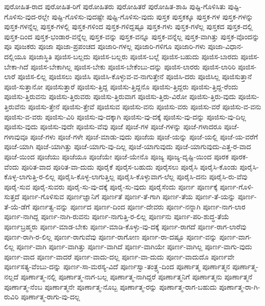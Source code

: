 {ಪುರೋಹಿತ-ರಾದ
ಪುರೋಹಿತ-ರಿಗೆ
ಪುರೋಹಿತರು
ಪುರೋಹಿತರೆ
ಪುರೋಹಿತ-ಶಾಹಿ
ಪುಷ್ಟಿ-ಗೊಳಿಸಿತು
ಪುಷ್ಟಿ-ಗೊಳಿಸು-ವುದ-ರಲ್ಲೇ
ಪುಷ್ಟಿ-ಗೊಳಿಸು-ವುದಷ್ಟೇ
ಪುಷ್ಟಿ-ಗೊಳಿಸು-ವುದು
ಪುಸ್ತಕ
ಪುಸ್ತಕಕ್ಕೂ
ಪುಸ್ತಕ-ಗಳ
ಪುಸ್ತಕ-ಗಳನ್ನು
ಪುಸ್ತಕ-ಗಳನ್ನೆಲ್ಲ
ಪುಸ್ತಕ-ಗಳಲ್ಲಿ
ಪುಸ್ತಕ-ಗಳಿಂದ
ಪುಸ್ತಕ-ಗಳಿದ್ದಷ್ಟೂ
ಪುಸ್ತಕ-ಗಳು
ಪುಸ್ತಕ-ಗಳೆಲ್ಲ
ಪುಸ್ತಕದ
ಪುಸ್ತಕ-ದಲ್ಲಿ
ಪುಸ್ತಕ-ದಿಂದ
ಪುಸ್ತಕ-ಭಂಡಾರ-ವನ್ನೆಲ್ಲ
ಪುಸ್ತಕ-ವನ್ನು
ಪುಸ್ತಕ-ವನ್ನೂ
ಪುಸ್ತಕ-ವನ್ನೆಲ್ಲ
ಪುಸ್ತಕ-ವಾಗಿತ್ತು
ಪುಸ್ತಕ-ವೊಂದನ್ನು
ಪೂ
ಪೂಜಕರು
ಪೂಜಾ
ಪೂಜಾ-ಪ್ರಪಂಚದ
ಪೂಜಾರಿ-ಗಳಲ್ಲ
ಪೂಜಾರಿ-ಗಳಿಗೂ
ಪೂಜಾರಿ-ಗಳು
ಪೂಜಾ-ವಿಧಾನ-ದಲ್ಲಿಯೂ
ಪೂಜಾಸ್ಥಿತಿ
ಪೂಜಿಸ-ಬಲ್ಲದು
ಪೂಜಿಸ-ಬಲ್ಲರು
ಪೂಜಿಸ-ಬಲ್ಲೆ
ಪೂಜಿಸ-ಬಹುದು
ಪೂಜಿಸ-ಬಾರದು
ಪೂಜಿಸ-ಬೇಕಾ-ಗಿದೆ
ಪೂಜಿಸ-ಬೇಕಾಗಿಲ್ಲ
ಪೂಜಿಸ-ಬೇಕು
ಪೂಜಿಸ-ಬೇಕೆಂಬು-ದನ್ನು
ಪೂಜಿಸ-ಲಾರರು
ಪೂಜಿಸ-ಲಾರಿರಿ
ಪೂಜಿಸ-ಲಾರೆ
ಪೂಜಿಸ-ಲಿಲ್ಲ
ಪೂಜಿಸಲು
ಪೂಜಿಸಿ
ಪೂಜಿಸಿ-ಕೊಳ್ಳುವ-ವ-ನಾಗುತ್ತೇನೆ
ಪೂಜಿಸಿ-ದರು
ಪೂಜಿಸಿಲ್ಲ
ಪೂಜಿಸುತ್ತಾನೆ
ಪೂಜಿ-ಸುತ್ತಾನೋ
ಪೂಜಿಸುತ್ತಾರೆ
ಪೂಜಿಸು-ತ್ತಿದ್ದ
ಪೂಜಿಸು-ತ್ತಿದ್ದನೊ
ಪೂಜಿಸು-ತ್ತಿದ್ದರು
ಪೂಜಿಸು-ತ್ತಿದ್ದ-ರೆಂದು
ಪೂಜಿಸು-ತ್ತಿರುವನು
ಪೂಜಿಸು-ತ್ತಿರುವರು
ಪೂಜಿಸು-ತ್ತಿರುವಾಗ
ಪೂಜಿಸು-ತ್ತಿರು-ವಿರೋ
ಪೂಜಿಸು-ತ್ತಿರು-ವುದು
ಪೂಜಿಸು-ತ್ತಿರುವೆನು
ಪೂಜಿಸು-ತ್ತೇನೆ
ಪೂಜಿಸು-ತ್ತೇವೆ
ಪೂಜಿಸುವ
ಪೂಜಿಸು-ವನು
ಪೂಜಿಸು-ವರು
ಪೂಜಿಸು-ವರೆ
ಪೂಜಿಸು-ವ-ವನು
ಪೂಜಿಸು-ವ-ವರು
ಪೂಜಿಸು-ವಿರಿ
ಪೂಜಿಸು-ವು-ದಕ್ಕಾಗಿ
ಪೂಜಿಸು-ವು-ದಕ್ಕೆ
ಪೂಜಿಸು-ವು-ದನ್ನು
ಪೂಜಿಸು-ವು-ದಿಲ್ಲ
ಪೂಜಿಸು-ವುದು
ಪೂಜಿಸು-ವುದೇ
ಪೂಜಿಸು-ವೆವು
ಪೂಜೆ
ಪೂಜೆ-ಗಳ
ಪೂಜೆ-ಗಳನ್ನು
ಪೂಜೆ-ಗಳಾದರೂ
ಪೂಜೆ-ಗಳಾವುವೂ
ಪೂಜೆ-ಗಳು
ಪೂಜೆ-ಗಳೇ
ಪೂಜೆ-ಮಾಡು-ವುದು
ಪೂಜೆಯ
ಪೂಜೆ-ಯನ್ನು
ಪೂಜೆ-ಯಲ್ಲಿ
ಪೂಜೆ-ಯ-ವರೆಗೆ
ಪೂಜೆ-ಯಾಗಿ
ಪೂಜೆ-ಯಾಗಿತ್ತು
ಪೂಜೆ-ಯಾಗು-ವು-ದಿಲ್ಲ
ಪೂಜೆ-ಯಾಗುವುದು
ಪೂಜೆ-ಯಾಗುವುದು-ಎತ್ತ-ರ-ವಾದ
ಪೂಜೆ-ಯಿಂದ
ಪೂಜೆಯು
ಪೂಜೆಯೂ
ಪೂಜೆಯೇ
ಪೂಜೆ-ಯೇನೊ
ಪೂಜ್ಯ
ಪೂಜ್ಯ-ದೃಷ್ಟಿ-ಯಿಂದ
ಪೂರಕ
ಪೂರಕ-ವೆಂದು
ಪೂರಿತ-ವಾದ
ಪೂರಿತ-ವಾ-ದುದು
ಪೂರೈಕೆ
ಪೂರೈಸ-ಬಹುದು
ಪೂರೈಸಲು
ಪೂರೈಸಿ
ಪೂರೈಸಿ-ಕೊಂಡು
ಪೂರೈಸಿ-ಕೊಳ್ಳ-ಲಾಗುತ್ತಿ-ರ-ಲಿಲ್ಲ
ಪೂರೈಸಿ-ಕೊಳ್ಳ-ಲಾಗುತ್ತಿಲ್ಲ
ಪೂರೈಸಿ-ಕೊಳ್ಳುವಾಗ-ಲೆಲ್ಲ
ಪೂರೈಸಿ-ದನು
ಪೂರೈಸಿ-ರು-ವೆವು
ಪೂರೈ-ಸುವ
ಪೂರೈ-ಸುವರು
ಪೂರೈ-ಸು-ವು-ದಕ್ಕೆ
ಪೂರೈ-ಸು-ವುದು
ಪೂರೈಸೆಂದು
ಪೂರ್ಣ
ಪೂರ್ಣಕ್ಕೆ
ಪೂರ್ಣ-ಗೊಳಿ-ಸುತ್ತದೆ
ಪೂರ್ಣ-ಗೊಳಿಸುವ
ಪೂರ್ಣಜ್ಞಾನಿಗೆ
ಪೂರ್ಣತೆ
ಪೂರ್ಣ-ತೆ-ಗಾಗಿ
ಪೂರ್ಣ-ತೆಯ
ಪೂರ್ಣ-ತೆ-ಯನ್ನು
ಪೂರ್ಣ-ತೆ-ಯೆ-ಡೆಗೆ
ಪೂರ್ಣತ್ವ-ವನ್ನು
ಪೂರ್ಣದ
ಪೂರ್ಣ-ದಿಂದ
ಪೂರ್ಣ-ದೇವರು
ಪೂರ್ಣ-ನನ್ನಾಗಿ
ಪೂರ್ಣ-ನಾಗ-ಲಾರ
ಪೂರ್ಣ-ನಾಗಿದ್ದ
ಪೂರ್ಣ-ನಾಗಿ-ರುವನು
ಪೂರ್ಣ-ನಾಗುತ್ತಿ-ರ-ಲಿಲ್ಲ
ಪೂರ್ಣನು
ಪೂರ್ಣ-ಪರಿ-ಶುದ್ಧ-ತೆಯೆ
ಪೂರ್ಣಬ್ರಹ್ಮರು
ಪೂರ್ಣ-ಮಾಡ-ಬೇಕು
ಪೂರ್ಣ-ಮಾಡಿ-ಕೊಳ್ಳು-ವು-ದಕ್ಕೆ
ಪೂರ್ಣ-ರಾಗದೆ
ಪೂರ್ಣ-ರಾಗ-ಲಾರೆವು
ಪೂರ್ಣ-ರಾಗಿ-ರ-ಲಿಲ್ಲ
ಪೂರ್ಣ-ರಾಗುವೆವು
ಪೂರ್ಣ-ರಾಗೋಣ
ಪೂರ್ಣ-ರಾ-ದಷ್ಟೂ
ಪೂರ್ಣ-ವನ್ನು
ಪೂರ್ಣ-ವಾಗ-ಲಿಲ್ಲ
ಪೂರ್ಣ-ವಾಗಿ
ಪೂರ್ಣ-ವಾಗಿತ್ತು
ಪೂರ್ಣ-ವಾಗಿದೆ
ಪೂರ್ಣ-ವಾಗಿಯೇ
ಪೂರ್ಣ-ವಾಗಿಲ್ಲ
ಪೂರ್ಣ-ವಾಗು-ವುದು
ಪೂರ್ಣ-ವಾದ
ಪೂರ್ಣ-ವಾದರೆ
ಪೂರ್ಣ-ವಾದು-ದಲ್ಲ
ಪೂರ್ಣ-ವಾ-ದುದು
ಪೂರ್ಣ-ವಾದುದೊ
ಪೂರ್ಣವೇ
ಪೂರ್ಣಸತ್ಯ-ವೆಂಬು-ದನ್ನು
ಪೂರ್ಣ-ಸಾ-ಮರಸ್ಯ-ವಿದೆ
ಪೂರ್ಣಸ್ವಾ-ತಂತ್ರ್ಯ-ದಿಂದ
ಪೂರ್ಣಾತ್ಮ
ಪೂರ್ಣಾತ್ಮನ
ಪೂರ್ಣಾತ್ಮ-ನಲ್ಲದೆ
ಪೂರ್ಣಾತ್ಮ-ನಲ್ಲಿ
ಪೂರ್ಣಾತ್ಮ-ನಾಗ-ಬಲ್ಲ
ಪೂರ್ಣಾತ್ಮ-ನಾಗಿದ್ದರೆ
ಪೂರ್ಣಾತ್ಮನಿಗೆ
ಪೂರ್ಣಾತ್ಮನು
ಪೂರ್ಣಾತ್ಮನೆ
ಪೂರ್ಣಾತ್ಮ-ನೆಂಬ
ಪೂರ್ಣಾತ್ಮನೇ
ಪೂರ್ಣಾತ್ಮ-ನೊಬ್ಬ
ಪೂರ್ಣಾತ್ಮ-ರನ್ನು
ಪೂರ್ಣಾತ್ಮ-ರಾಗ-ಬಹುದು
ಪೂರ್ಣಾತ್ಮ-ರಾ-ಗಿ-ರುವಿರಿ
ಪೂರ್ಣಾತ್ಮ-ರಾಗು-ವು-ದಲ್ಲ
}
